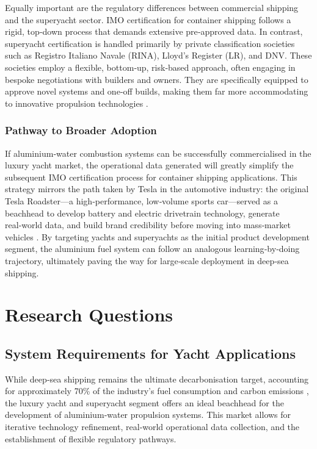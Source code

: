 \documentclass[12pt]{article}
\begin{document}
Equally important are the regulatory differences between commercial shipping and the superyacht sector. IMO certification for container shipping follows a rigid, top‑down process that demands extensive pre‑approved data. In contrast, superyacht certification is handled primarily by private classification societies such as Registro Italiano Navale (RINA), Lloyd’s Register (LR), and DNV. These societies employ a flexible, bottom‑up, risk‑based approach, often engaging in bespoke negotiations with builders and owners. They are specifically equipped to approve novel systems and one‑off builds, making them far more accommodating to innovative propulsion technologies \cite{novel-ships-approval, yacht-certification-societies}.

\subsubsection{Pathway to Broader Adoption}

If aluminium‑water combustion systems can be successfully commercialised in the luxury yacht market, the operational data generated will greatly simplify the subsequent IMO certification process for container shipping applications. This strategy mirrors the path taken by Tesla in the automotive industry: the original Tesla Roadster—a high‑performance, low‑volume sports car—served as a beachhead to develop battery and electric drivetrain technology, generate real‑world data, and build brand credibility before moving into mass‑market vehicles \cite{telsa-roadster-mit, tesla-beachhead}. By targeting yachts and superyachts as the initial product development segment, the aluminium fuel system can follow an analogous learning‑by‑doing trajectory, ultimately paving the way for large‑scale deployment in deep‑sea shipping.

\break

\section{Research Questions}

\subsection{System Requirements for Yacht Applications}
\label{sec-system-requirements-questions}

While deep‑sea shipping remains the ultimate decarbonisation target, accounting for approximately 70\% of the industry’s fuel consumption and carbon emissions \cite{share-of-different-range-ships}, the luxury yacht and superyacht segment offers an ideal beachhead for the development of aluminium‑water propulsion systems. This market allows for iterative technology refinement, real‑world operational data collection, and the establishment of flexible regulatory pathways.
\end{document}
